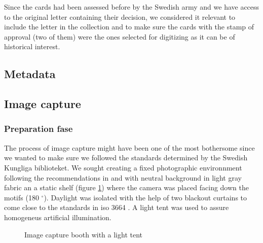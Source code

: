 \documentclass[12 pt]{paper}
\begin{document}
Since the cards had been assessed before by the Swedish army and we have access to the original letter containing their decision, we considered it relevant to include the letter in the collection and to make sure the cards with the stamp of approval (two of them) were the ones selected for digitizing as it can be of historical interest. 
\subsection{Metadata}

\subsection{Image capture}

\subsubsection{Preparation fase}
The process of image capture might have been one of the most bothersome since we wanted to make sure we followed the standards determined by the Swedish Kungliga biblioteket. We sought creating a fixed photographic environnment following the recommendations in \textcite[]{dgf1216} and \textcite[part 3]{kronlund2021p3} with neutral background in light gray fabric an a static shelf (figure \ref{baset}) where the camera was placed facing down the motifs (180 $ ^{\circ} $).  Daylight was isolated with the help of two blackout curtains to come close to the standards in iso 3664 \autocite[cf.][]{johansson2021}. A light tent was used to assure homogeneus artificial illumination.  %



\begin{figure}[!htb]
	\centering
	\caption[short:]{Image capture booth with a light tent}
	\label{baset}
\end{figure}
\end{document}

